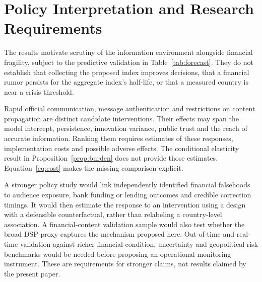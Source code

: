 \section{Policy Interpretation and Research Requirements}\label{sec:policy}

The results motivate scrutiny of the information environment alongside
financial fragility, subject to the predictive validation in
Table~\ref{tab:forecast}. They do not establish that collecting the proposed
index improves decisions, that a financial rumor persists for the aggregate
index's half-life, or that a measured country is near a crisis threshold.

Rapid official communication, message authentication and restrictions on
content propagation are distinct candidate interventions. Their effects may
span the model intercept, persistence, innovation variance, public trust and
the reach of accurate information. Ranking them requires estimates of these
responses, implementation costs and possible adverse effects. The conditional
elasticity result in Proposition~\ref{prop:burden} does not provide those
estimates. Equation~\eqref{eq:cost} makes the missing comparison explicit.

A stronger policy study would link independently identified financial
falsehoods to audience exposure, bank funding or lending outcomes and
credible correction timings. It would then estimate the response to an
intervention using a design with a defensible counterfactual, rather than
relabeling a country-level association. A financial-content validation sample
would also test whether the broad DSP proxy captures the mechanism proposed
here. Out-of-time and real-time validation against richer financial-condition,
uncertainty and geopolitical-risk benchmarks would be needed before proposing
an operational monitoring instrument. These are requirements for stronger
claims, not results claimed by the present paper.
